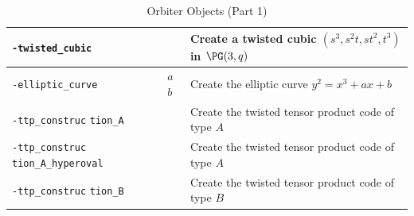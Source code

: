 \begin{table}
\begin{center}
\begin{tabular}{|p{4cm}|l|p{8cm}|}
\hline
\verb'-twisted_cubic' & & Create a twisted cubic $(s^3,s^2t,st^2,t^3)$ in $\PG(3,q)$\\
\hline
\verb'-elliptic_curve' & $a$ $b$ & Create the elliptic curve $y^2=x^3+ax+b$ \\
\hline
\verb'-ttp_construc' \verb'tion_A' &  & Create the twisted tensor product code of type $A$~\cite{Betten2008} \\
\hline
\verb'-ttp_construc' \verb'tion_A_hyperoval' &  & Create the twisted tensor product code of type $A$~\cite{Betten2008} \\
\hline
\verb'-ttp_construc' \verb'tion_B' &  & Create the twisted tensor product code of type $B$~\cite{Betten2008} \\
\hline
\end{tabular}
\end{center}
\caption{\label{tab:objects}Orbiter Objects (Part 1)}
\end{table}
